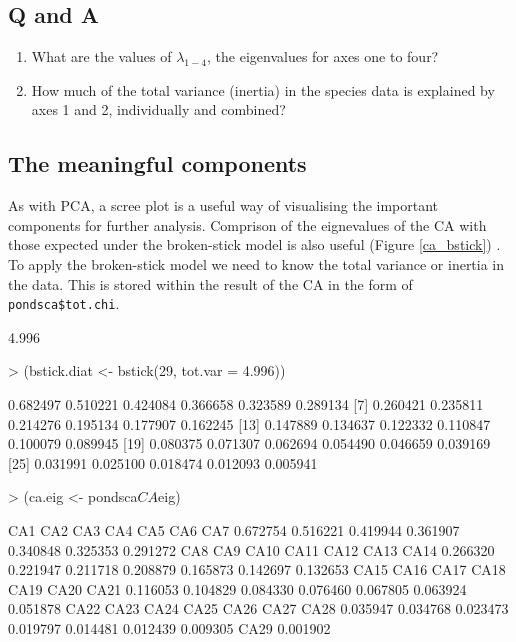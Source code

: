 \documentclass[a4paper,10pt]{article}
\begin{document}
\subsection*{Q and A}
\begin{enumerate}
\item What are the values of $\lambda_{1-4}$, the eigenvalues for axes one to four?
\item How much of the total variance (inertia) in the species data is explained by axes 1 and 2, individually and combined?
\end{enumerate}

\subsection{The meaningful components}
As with PCA, a scree plot is a useful way of visualising the important components for further analysis. Comprison of the eignevalues of the CA with those expected under the broken-stick model is also useful (Figure \ref{ca_bstick}) . To apply the broken-stick model we need to know the total variance or inertia in the data. This is stored within the result of the CA in the form of \texttt{pondsca\$tot.chi}.
\begin{Schunk}
\begin{Soutput}
[1] 4.996
\end{Soutput}
\begin{Sinput}
> (bstick.diat <- bstick(29, tot.var = 4.996))
\end{Sinput}
\begin{Soutput}
 [1] 0.682497 0.510221 0.424084 0.366658 0.323589 0.289134
 [7] 0.260421 0.235811 0.214276 0.195134 0.177907 0.162245
[13] 0.147889 0.134637 0.122332 0.110847 0.100079 0.089945
[19] 0.080375 0.071307 0.062694 0.054490 0.046659 0.039169
[25] 0.031991 0.025100 0.018474 0.012093 0.005941
\end{Soutput}
\begin{Sinput}
> (ca.eig <- pondsca$CA$eig)
\end{Sinput}
\begin{Soutput}
     CA1      CA2      CA3      CA4      CA5      CA6      CA7 
0.672754 0.516221 0.419944 0.361907 0.340848 0.325353 0.291272 
     CA8      CA9     CA10     CA11     CA12     CA13     CA14 
0.266320 0.221947 0.211718 0.208879 0.165873 0.142697 0.132653 
    CA15     CA16     CA17     CA18     CA19     CA20     CA21 
0.116053 0.104829 0.084330 0.076460 0.067805 0.063924 0.051878 
    CA22     CA23     CA24     CA25     CA26     CA27     CA28 
0.035947 0.034768 0.023473 0.019797 0.014481 0.012439 0.009305 
    CA29 
0.001902 
\end{Soutput}
\end{Schunk}
\end{document}
